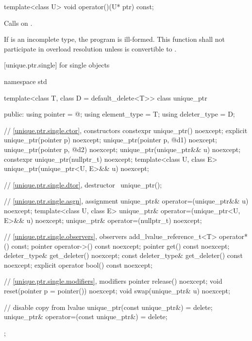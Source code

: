 %
\begin{itemdecl}
template<class U> void operator()(U* ptr) const;
\end{itemdecl}

\begin{itemdescr}
\pnum
\effects
Calls  on .

\pnum
\remarks If  is an incomplete type, the program is ill-formed.
This function shall not participate in overload resolution
unless  is convertible to .
\end{itemdescr}

[unique.ptr.single]{ for single objects}

%
\begin{codeblock}
namespace std {
  template<class T, class D = default_delete<T>> class unique_ptr {
  public:
    using pointer      = @\seebelow@;
    using element_type = T;
    using deleter_type = D;

    // \ref{unique.ptr.single.ctor}, constructors
    constexpr unique_ptr() noexcept;
    explicit unique_ptr(pointer p) noexcept;
    unique_ptr(pointer p, @\seebelow@ d1) noexcept;
    unique_ptr(pointer p, @\seebelow@ d2) noexcept;
    unique_ptr(unique_ptr&& u) noexcept;
    constexpr unique_ptr(nullptr_t) noexcept;
    template<class U, class E>
      unique_ptr(unique_ptr<U, E>&& u) noexcept;

    // \ref{unique.ptr.single.dtor}, destructor
    ~unique_ptr();

    // \ref{unique.ptr.single.asgn}, assignment
    unique_ptr& operator=(unique_ptr&& u) noexcept;
    template<class U, class E>
      unique_ptr& operator=(unique_ptr<U, E>&& u) noexcept;
    unique_ptr& operator=(nullptr_t) noexcept;

    // \ref{unique.ptr.single.observers}, observers
    add_lvalue_reference_t<T> operator*() const;
    pointer operator->() const noexcept;
    pointer get() const noexcept;
    deleter_type& get_deleter() noexcept;
    const deleter_type& get_deleter() const noexcept;
    explicit operator bool() const noexcept;

    // \ref{unique.ptr.single.modifiers}, modifiers
    pointer release() noexcept;
    void reset(pointer p = pointer()) noexcept;
    void swap(unique_ptr& u) noexcept;

    // disable copy from lvalue
    unique_ptr(const unique_ptr&) = delete;
    unique_ptr& operator=(const unique_ptr&) = delete;
  };
}
\end{codeblock}

